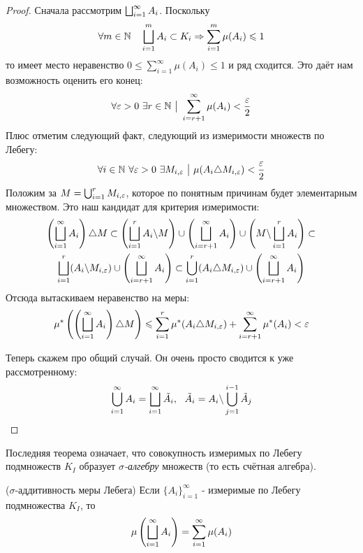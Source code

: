 \begin{proof}
	Сначала рассмотрим $\bigsqcup_{i = 1}^\infty A_i$. Поскольку
	\[
		\forall m \in \mathbb{N} \quad \bigsqcup_{i = 1}^m A_i \subset K_i \Rightarrow \sum_{i = 1}^m \mu(A_i) \leqslant 1
	\]
	то имеет место неравенство $0 \le \sum_{i = 1}^\infty \mu(A_i)\le 1$ и ряд сходится. Это даёт нам возможность оценить его конец:
	\[
		\forall \varepsilon > 0\ \exists r \in \mathbb{N} \ \big|\  \sum_{i = r + 1}^\infty \mu(A_i) < \frac{\varepsilon}{2}
	\]
	Плюс отметим следующий факт, следующий из измеримости множеств по Лебегу:
	\[
		\forall i \in \N\ \forall \eps > 0\ \exists M_{i, \eps} \such \mu(A_i \tr M_{i, \eps}) < \frac{\eps}{2}
	\]
	Положим за $M = \bigcup_{i = 1}^r M_{i, \varepsilon}$, которое по понятным причинам будет элементарным множеством. Это наш кандидат для критерия измеримости:
	\begin{multline*}
		\left(\bigsqcup_{i = 1}^\infty A_i\right) \triangle M \subset \left(\bigsqcup_{i = 1}^r A_i \backslash M\right) \cup \left(\bigsqcup_{i = r + 1}^\infty A_i\right) \cup \left(M \backslash \bigsqcup_{i = 1}^r A_i\right) \subset
		\\
		\bigsqcup_{i = 1}^r (A_i \backslash M_{i, \varepsilon}) \cup \left(\bigsqcup_{i = r + 1}^\infty A_i\right) \subset \bigcup_{i = 1}^r (A_i \triangle M_{i, \varepsilon}) \cup \left(\bigsqcup_{i = r + 1}^\infty A_i\right)
	\end{multline*}
	Отсюда вытаскиваем неравенство на меры:
	\[
		\mu^* \left(\left(\bigsqcup_{i = 1}^\infty A_i\right) \triangle M\right) \leqslant \sum_{i = 1}^r \mu^* (A_i \triangle M_{i, \varepsilon}) + \sum_{i = r + 1}^\infty \mu^* (A_i) < \varepsilon
	\]
	
	Теперь скажем про общий случай. Он очень просто сводится к уже рассмотренному:
	\[
		\bigcup_{i = 1}^\infty A_i = \bigsqcup_{i = 1}^\infty \tilde{A}_i,\ \ \tilde{A}_i = A_i \backslash \bigcup_{j = 1}^{i - 1} \tilde{A}_j
	\]
\end{proof}

\begin{note}
	Последняя теорема означает, что совокупность измеримых по Лебегу подмножеств $K_I$ образует \textit{$\sigma$-алгебру} множеств (то есть счётная алгебра).
\end{note}

\begin{theorem} ($\sigma$-аддитивность меры Лебега)
	Если $\{A_i\}_{i = 1}^\infty$ - измеримые по Лебегу подмножества $K_I$, то
	\[
		\mu\left(\bigsqcup_{i = 1}^\infty A_i\right) = \sum_{i = 1}^\infty \mu(A_i)
	\]
\end{theorem}

